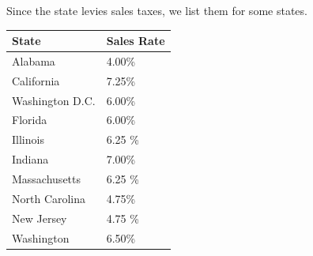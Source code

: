 \documentclass{article}
\begin{document}
  \begin{example}
    Since the state levies sales taxes, we list them for some states. 
    \begin{center}
    \begin{tabular}{l|l}
        State & Sales Rate \\
        \hline
        Alabama & 4.00\% \\
        California & 7.25\% \\
        Washington D.C. & 6.00\% \\
        Florida & 6.00\% \\
        Illinois & 6.25 \%\\
        Indiana & 7.00\%\\
        Massachusetts & 6.25 \%\\
        North Carolina & 4.75\%\\
        New Jersey & 4.75 \%\\
        Washington & 6.50\%
    \end{tabular}
    \end{center}
  \end{example}
\end{document}
